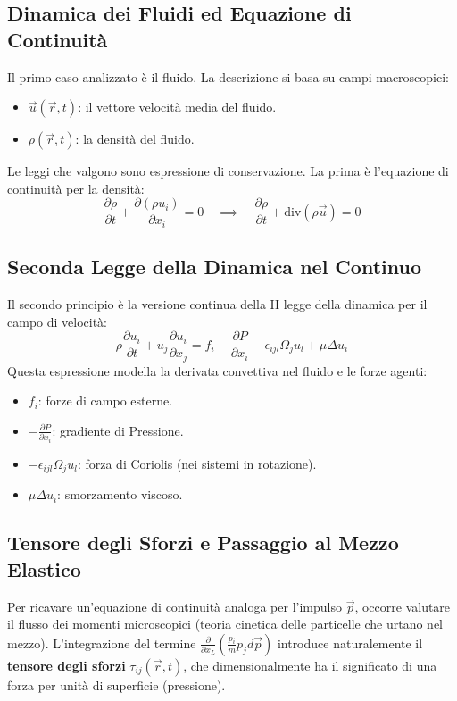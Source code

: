 \documentclass[12pt,a4paper]{article}
\begin{document}
\subsection{Dinamica dei Fluidi ed Equazione di Continuità}
Il primo caso analizzato è il fluido. La descrizione si basa su campi macroscopici:
\begin{itemize}
    \item $\vec{u}(\vec{r}, t)$: il vettore velocità media del fluido.
    \item $\rho(\vec{r}, t)$: la densità del fluido.
\end{itemize}
Le leggi che valgono sono espressione di conservazione. La prima è l'equazione di continuità per la densità:
\begin{equation}
\frac{\partial \rho}{\partial t} + \frac{\partial (\rho u_i)}{\partial x_i} = 0 \quad \implies \quad \frac{\partial \rho}{\partial t} + \text{div}(\rho \vec{u}) = 0
\end{equation}

\subsection{Seconda Legge della Dinamica nel Continuo}
Il secondo principio è la versione continua della II legge della dinamica per il campo di velocità:
\begin{equation}
\rho \frac{\partial u_i}{\partial t} + u_j \frac{\partial u_i}{\partial x_j} = f_i - \frac{\partial P}{\partial x_i} - \epsilon_{ijl} \Omega_j u_l + \mu \Delta u_i
\end{equation}
Questa espressione modella la derivata convettiva nel fluido e le forze agenti:
\begin{itemize}
    \item $f_i$: forze di campo esterne.
    \item $-\frac{\partial P}{\partial x_i}$: gradiente di Pressione.
    \item $-\epsilon_{ijl} \Omega_j u_l$: forza di Coriolis (nei sistemi in rotazione).
    \item $\mu \Delta u_i$: smorzamento viscoso.
\end{itemize}

\subsection{Tensore degli Sforzi e Passaggio al Mezzo Elastico}
Per ricavare un'equazione di continuità analoga per l'impulso $\vec{p}$, occorre valutare il flusso dei momenti microscopici (teoria cinetica delle particelle che urtano nel mezzo). L'integrazione del termine $\frac{\partial}{\partial x_L} \left( \frac{p_i}{m} p_j d\vec{p} \right)$ introduce naturalemente il \textbf{tensore degli sforzi} $\tau_{ij}(\vec{r}, t)$, che dimensionalmente ha il significato di una forza per unità di superficie (pressione).
\end{document}
